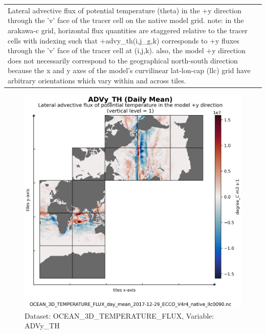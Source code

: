 \begin{longtable}{|m{}|m{}|m{}|m{}|}
\rowcolor{lightgray} \multicolumn{4}{|c|}{\textbf{Comments}} \\ \hline
\multicolumn{4}{|p{1\textwidth}|}{\footnotesize{{Lateral advective flux of potential temperature (theta) in the +y direction through the 'v' face of the tracer cell on the native model grid. note: in the arakawa-c grid, horizontal flux quantities are staggered relative to the tracer cells with indexing such that +advy\_th(i,j\_g,k) corresponds to +y fluxes through the 'v' face of the tracer cell at (i,j,k). also, the model +y direction does not necessarily correspond to the geographical north-south direction because the x and y axes of the model's curvilinear lat-lon-cap (llc) grid have arbitrary orientations which vary within and across tiles.}}} \\ \hline
\end{longtable}

\begin{figure}[H]
\centering
\includegraphics[scale=0.55]{../images/plots/native_plots/Ocean_Three-Dimensional_Potential_Temperature_Fluxes/ADVy_TH.png}
\caption{Dataset: OCEAN\_3D\_TEMPERATURE\_FLUX, Variable: ADVy\_TH}
\label{tab:table-OCEAN_3D_TEMPERATURE_FLUX_ADVy_TH-Plot}
\end{figure}
\newpage
\pagebreak
